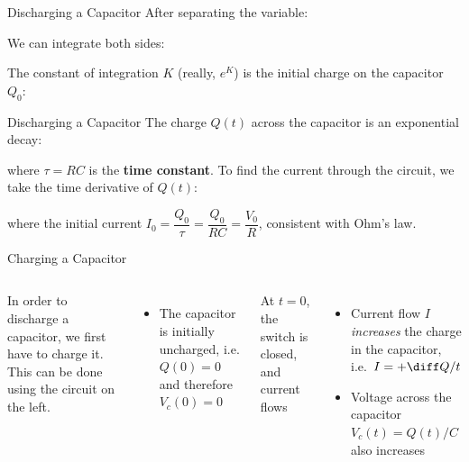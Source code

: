 \documentclass[12pt,aspectratio=169]{beamer}
\begin{document}
\begin{frame}{Discharging a Capacitor}
  After separating the variable:

  
  We can integrate both sides:%


  The constant of integration $K$ (really, $e^K$) is the initial charge on the
  capacitor $Q_0$:

\end{frame}



\begin{frame}{Discharging a Capacitor}
  The charge $Q(t)$ across the capacitor is an exponential decay:


  \vspace{-.1in}where $\tau=RC$ is the \textbf{time constant}. To find the
  current through the circuit, we take the time derivative of $Q(t)$:


  where the initial current %
  $I_0=\dfrac{Q_0}\tau=\dfrac{Q_0}{RC}=\dfrac{V_0}R$, consistent with Ohm's law.
\end{frame}



\begin{frame}{Charging a Capacitor}
  \begin{columns}[T]
    \centering
    
    In order to discharge a capacitor, we first have to charge it. This can be
    done using the circuit on the left.
    \begin{itemize}
    \item The capacitor is initially uncharged, i.e. $Q(0)=0$ and therefore
      $V_c(0)=0$
    \end{itemize}
    At $t=0$, the switch is closed, and current flows
    \begin{itemize}
    \item Current flow $I$ \emph{increases} the charge in the capacitor, i.e.\
      $I=+\diff Q/t$
    \item Voltage across the capacitor $V_c(t)=Q(t)/C$ also increases
    \end{itemize}
  \end{columns}
\end{frame}
\end{document}
